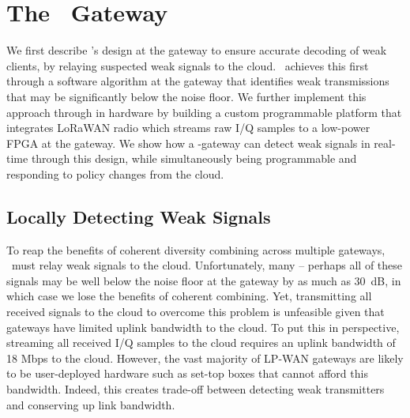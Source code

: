 \section{The \name\ Gateway}
\label{sec:gateway}



We first describe \name's design at the gateway to ensure accurate decoding of weak clients, by relaying suspected weak signals to the cloud. \name\ achieves this first through a software algorithm at the gateway that identifies weak transmissions that may be significantly below the noise floor. We further implement this approach through in hardware by building a custom programmable platform that integrates LoRaWAN radio which streams raw I/Q samples to a low-power FPGA at the gateway. We show how a \name-gateway can detect weak signals in real-time through this design, while simultaneously being programmable and responding to policy changes from the cloud. 

\subsection{Locally Detecting Weak Signals}
\label{sec:local-detection}
To reap the benefits of coherent diversity combining across multiple gateways, \name\ must relay weak signals to the cloud. Unfortunately, many -- perhaps all of these signals may be well below the noise floor at the gateway by as much as 30~dB, in which case we lose the benefits of coherent combining. Yet, transmitting all received signals to the cloud to overcome this problem is unfeasible given that gateways have limited uplink bandwidth to the cloud. To put this in perspective, streaming all received I/Q samples to the cloud requires an uplink bandwidth of 18 Mbps to the cloud. However, the vast majority of LP-WAN gateways are likely to be user-deployed hardware such as set-top boxes that cannot afford this bandwidth. Indeed, this creates  trade-off between detecting weak transmitters and conserving up link bandwidth.

